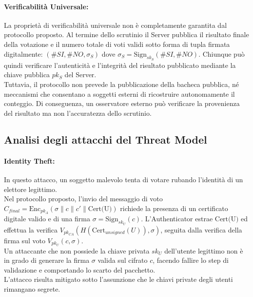 \paragraph{Verificabilità Universale:}
La proprietà di verificabilità universale non è completamente garantita dal protocollo proposto. Al termine dello scrutinio il Server pubblica il risultato finale della votazione e il numero totale di voti validi sotto forma di tupla firmata digitalmente: $(\# SI, \# NO, \sigma_S)$ dove $\sigma_S = \text{Sign}_{sk_S}(\# SI, \# NO)$. Chiunque può quindi verificare l'autenticità e l'integrità del risultato pubblicato mediante la chiave pubblica $pk_S$ del Server. \\
Tuttavia, il protocollo non prevede la pubblicazione della bacheca pubblica, né meccanismi che consentano a soggetti esterni di ricostruire autonomamente il conteggio. Di conseguenza, un osservatore esterno può verificare la provenienza del risultato ma non l'accuratezza dello scrutinio.


\subsection{Analisi degli attacchi del Threat Model}

\paragraph{Identity Theft:}
In questo attacco, un soggetto malevolo tenta di votare rubando l'identità di un elettore legittimo. \\
Nel protocollo proposto, l'invio del messaggio di voto $C_{final} = \text{Enc}_{pk_A}(\sigma \| c \| c' \| \text{Cert(U)})$ richiede la presenza di un certificato digitale valido e di una firma $\sigma = \text{Sign}_{sk_U}(c)$. L'Authenticator estrae $\text{Cert(U)}$ ed effettua la verifica $V_{pk_{CA}}(H(\text{Cert}_{unsigned}(U)), \sigma)$, seguita dalla verifica della firma sul voto $V_{pk_U}(c, \sigma)$. \\
Un attaccante che non possiede la chiave privata $sk_U$ dell'utente legittimo non è in grado di generare la firma $\sigma$ valida sul cifrato $c$, facendo fallire lo step di validazione e comportando lo scarto del pacchetto. \\
L'attacco risulta mitigato sotto l'assunzione che le chiavi private degli utenti rimangano segrete.

